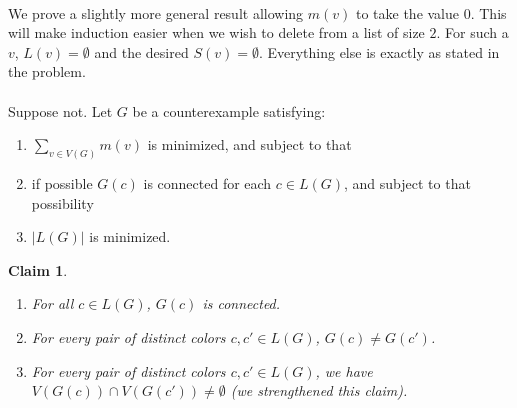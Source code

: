 \documentclass[letterpaper,12pt,oneside,onecolumn]{article}
\newtheorem{claim}[fact]{Claim}
\begin{document}
\paragraph{}
We prove a slightly more general result allowing $m(v)$ to take the value $0$. This will make induction easier when we wish to delete from a list of size $2$. For such a $v$, $L(v)= \emptyset$ and the desired $S(v) = \emptyset$. Everything else is exactly as stated in the problem.
\paragraph{}
Suppose not. Let $G$ be a counterexample satisfying:
\begin{enumerate}
	\item $\sum_{v \in V(G)} m(v)$ is minimized, and subject to that
	\item if possible $G(c)$ is connected for each $c \in L(G)$, and subject to that possibility
	\item $|L(G)|$ is minimized.
\end{enumerate}
\begin{claim}
	\begin{enumerate}
		\item For all $c \in L(G)$, $G(c)$ is connected.
		\item For every pair of distinct colors $c,c' \in L(G)$, $G(c) \neq G(c')$.
		\item For every pair of distinct colors $c, c' \in L(G)$, we have $V(G(c)) \cap V(G(c')) \neq \emptyset$ (we strengthened this claim).
	\end{enumerate}
\end{claim}
\end{document}
